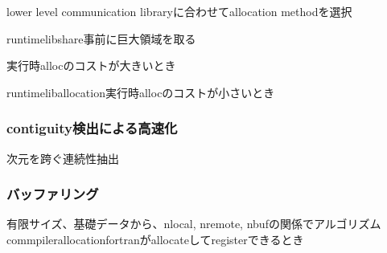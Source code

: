 lower level communication libraryに合わせてallocation methodを選択

runtimelibshare事前に巨大領域を取る

実行時allocのコストが大きいとき


runtimeliballocation実行時allocのコストが小さいとき

\subsubsection{contiguity検出による高速化}
次元を跨ぐ連続性抽出

\subsubsection{バッファリング}
有限サイズ、基礎データから、nlocal, nremote, nbufの関係でアルゴリズム
commpilerallocationfortranがallocateしてregisterできるとき



